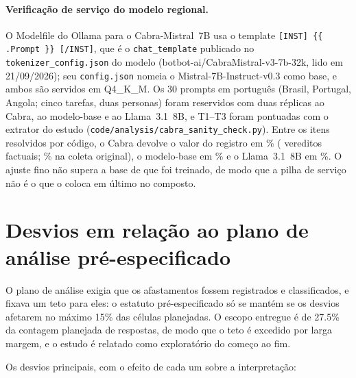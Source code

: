 \documentclass[11pt,a4paper]{article}
\begin{document}
\paragraph{Verificação de serviço do modelo regional.} O Modelfile do Ollama
para o Cabra-Mistral~7B usa o template \texttt{[INST] \{\{ .Prompt \}\} [/INST]},
que é o \texttt{chat\_template} publicado no \texttt{tokenizer\_config.json} do
modelo (botbot-ai/CabraMistral-v3-7b-32k, lido em 21/09/2026); seu
\texttt{config.json} nomeia o Mistral-7B-Instruct-v0.3 como base, e ambos são
servidos em Q4\_K\_M. Os 30 prompts em português (Brasil, Portugal, Angola;
cinco tarefas, duas personas) foram reservidos com duas réplicas ao Cabra, ao
modelo-base e ao Llama~3.1~8B, e T1--T3 foram pontuadas com o extrator do estudo
(\texttt{code/analysis/cabra\_sanity\_check.py}). Entre os itens resolvidos por
código, o Cabra devolve o valor do registro em \ncabsanitycabra\%
(\ncabsanityn{} vereditos factuais; \ncabsanityorig\% na coleta original), o
modelo-base em \ncabsanitybase\% e o Llama~3.1~8B em \ncabsanityllama\%.
O ajuste fino não supera a base de que foi treinado, de modo que a pilha de
serviço não é o que o coloca em último no composto.

\section{Desvios em relação ao plano de análise pré-especificado}
\label{sec:s-desvios-pt}

O plano de análise exigia que os afastamentos fossem registrados e classificados, e
fixava um teto para eles: o estatuto pré-especificado só se mantém se os desvios
afetarem no máximo 15\% das células planejadas. O escopo entregue é de 27.5\% da
contagem planejada de respostas, de modo que o teto é excedido por larga margem, e
o estudo é relatado como exploratório do começo ao fim.

Os desvios principais, com o efeito de cada um sobre a interpretação:
\end{document}

